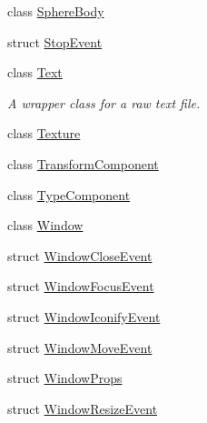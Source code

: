 \begin{DoxyCompactItemize}
class \hyperlink{classTarbora_1_1SphereBody}{Sphere\+Body}
\item 
struct \hyperlink{structTarbora_1_1StopEvent}{Stop\+Event}
\item 
class \hyperlink{classTarbora_1_1Text}{Text}
\begin{DoxyCompactList}\small\item\em A wrapper class for a raw text file. \end{DoxyCompactList}\item 
class \hyperlink{classTarbora_1_1Texture}{Texture}
\item 
class \hyperlink{classTarbora_1_1TransformComponent}{Transform\+Component}
\item 
class \hyperlink{classTarbora_1_1TypeComponent}{Type\+Component}
\item 
class \hyperlink{classTarbora_1_1Window}{Window}
\item 
struct \hyperlink{structTarbora_1_1WindowCloseEvent}{Window\+Close\+Event}
\item 
struct \hyperlink{structTarbora_1_1WindowFocusEvent}{Window\+Focus\+Event}
\item 
struct \hyperlink{structTarbora_1_1WindowIconifyEvent}{Window\+Iconify\+Event}
\item 
struct \hyperlink{structTarbora_1_1WindowMoveEvent}{Window\+Move\+Event}
\item 
struct \hyperlink{structTarbora_1_1WindowProps}{Window\+Props}
\item 
struct \hyperlink{structTarbora_1_1WindowResizeEvent}{Window\+Resize\+Event}
\end{DoxyCompactItemize}
